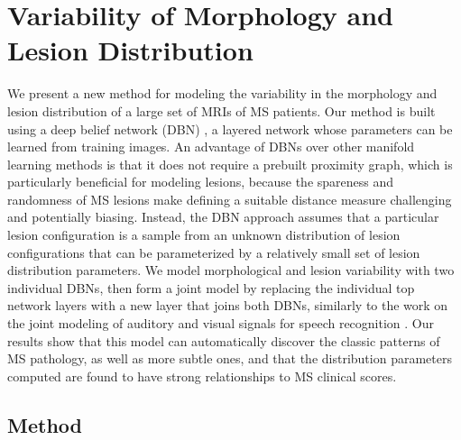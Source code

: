 \section{Variability of Morphology and Lesion Distribution}

We present a new method for modeling the variability in the morphology and
lesion distribution of a large set of MRIs of MS patients. Our method is built
using a deep belief network (DBN) \cite{Hinton2006b}, a layered network whose
parameters can be learned from training images. An advantage of DBNs over other
manifold learning methods is that it does not require a prebuilt proximity
graph, which is particularly beneficial for modeling lesions, because the
spareness and randomness of MS lesions make defining a suitable distance measure
challenging and potentially biasing. Instead, the DBN approach assumes that a
particular lesion configuration is a sample from an unknown distribution of
lesion configurations that can be parameterized by a relatively small set of
lesion distribution parameters. We model morphological and lesion variability
with two individual DBNs, then form a joint model by replacing the individual
top network layers with a new layer that joins both DBNs, similarly to the work
on the joint modeling of auditory and visual signals for speech recognition
\cite{Ngiam2011}. Our results show that this model can automatically discover
the classic patterns of MS pathology, as well as more subtle ones, and that the
distribution parameters computed are found to have strong relationships to MS
clinical scores.


\subsection{Method}

